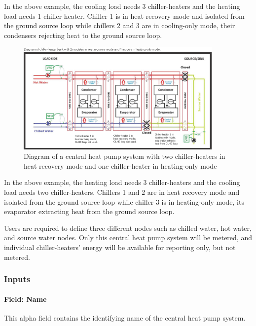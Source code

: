 In the above example, the cooling load needs 3 chiller-heaters and the heating load needs 1 chiller heater. Chiller 1 is in heat recovery mode and isolated from the ground source loop while chillers 2 and 3 are in cooling-only mode, their condensers rejecting heat to the ground source loop.

\begin{figure}[hbtp] %
\centering
\includegraphics[width=0.9\textwidth, height=0.9\textheight, keepaspectratio=true]{media/image188.png}
\caption{Diagram of a central heat pump system with two chiller-heaters in heat recovery mode and one chiller-heater in heating-only mode \protect \label{fig:diagram-of-a-central-heat-pump-system-with-003}}
\end{figure}

In the above example, the heating load needs 3 chiller-heaters and the cooling load needs two chiller-heaters. Chillers 1 and 2 are in heat recovery mode and isolated from the ground source loop while chiller 3 is in heating-only mode, its evaporator extracting heat from the ground source loop.

Users are required to define three different nodes such as chilled water, hot water, and source water nodes. Only this central heat pump system will be metered, and individual chiller-heaters' energy will be available for reporting only, but not metered.

\subsubsection{Inputs}\label{inputs-19-004}

\paragraph{Field: Name}\label{field-name-18-005}

This alpha field contains the identifying name of the central heat pump system.

